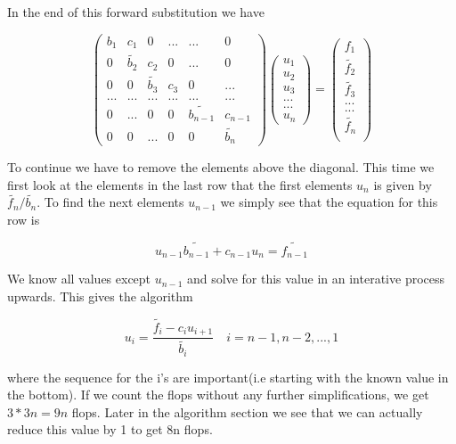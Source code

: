 \documentclass[a4paper,11pt]{article}
\begin{document}
{In the end of this forward substitution we have

\begin{equation}
	\begin{pmatrix}
		b_1 & c_1 & 0 & ... & ... & 0 \\
		0 & \tilde{b_2} & c_2 & 0 & ... & 0 \\
		0 & 0 & \tilde{b_3} & c_3 & 0 & ... \\
		... & ... & ... & ... & ... & ... \\
		0 & ... & 0 & 0 & \tilde{b_{n-1}} & c_{n-1} \\
		0 & 0 & ... & 0 & 0 & \tilde{b_{n}}
	\end{pmatrix} \begin{pmatrix}
	u_1\\
	u_2\\
	u_3\\
	...\\
	...\\
	u_n
\end{pmatrix} = \begin{pmatrix}
f_1 \\
\tilde{f_2} \\
\tilde{f_3} \\
... \\
... \\
\tilde{f_n} \\
\end{pmatrix}
\end{equation}

To continue we have to remove the elements above the diagonal. This time we first look at the elements in the last row that the first elements $u_n$ is given by $\tilde{f_n}/\tilde{b_n}$. To find the next elements $u_{n-1}$ we simply see that the equation for this row is 

\begin{equation}
	u_{n-1}\tilde{b_{n-1}}+c_{n-1}u_n = \tilde{f_{n-1}}
\end{equation}

We know all values except $u_{n-1}$ and solve for this value in an interative process upwards. This gives the algorithm 

\begin{equation}
	u_i = \frac{\tilde{f_i}-c_i u_{i+1}}{\tilde{b_i}}\quad i = n-1, n-2, ..., 1
	\label{eq:forward_general_u}
\end{equation}

where the sequence for the i's are important(i.e starting with the known value in the bottom). If we count the flops without any further simplifications, we get $3*3n=9n$ flops. Later in the algorithm section we see that we can actually reduce this value by 1 to get 8n flops. 


}
\end{document}

